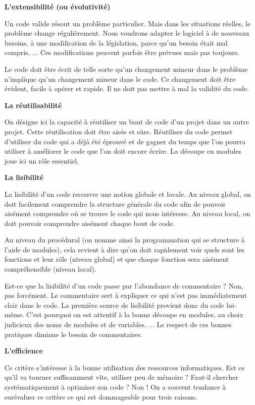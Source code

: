 {{\sffamily\bfseries\upshape
L'extensibilité (ou évolutivité)}

{
Un code valide résout un problème particulier. Mais dans les situations
réelles, le problème change régulièrement. Nous voudrons adapter le
logiciel à de nouveaux besoins, à une modification de la législation,
parce qu’un besoin était mal compris, ... Ces modifications peuvent
parfois être prévues mais pas toujours.}

{
Le code doit être écrit de telle sorte qu'un changement
mineur dans le problème n'implique
qu'un changement mineur dans le code. Ce changement
doit être évident, facile à opérer et rapide. Il ne doit pas mettre à
mal la validité du code.}

{\sffamily\bfseries\upshape
La réutilisabilité}

{
On désigne ici la capacité à réutiliser un bout de code
d'un projet dans un autre projet. Cette réutilisation
doit être aisée et sûre. Réutiliser du code permet
d'utiliser du code qui a déjà été éprouvé et de gagner
du temps que l'on pourra utiliser à améliorer le code
que l'on doit encore écrire. La découpe en modules
joue ici un rôle essentiel.}

{\sffamily\bfseries\upshape
La lisibilité}

{
La lisibilité d'un code recouvre une notion globale et
locale. Au niveau global, on doit facilement comprendre la structure
générale du code afin de pouvoir aisément comprendre où se trouve le
code qui nous intéresse. Au niveau local, on doit pouvoir comprendre
aisément chaque bout de code.}

{
Au niveau du procédural (on nomme ainsi la programmation qui se
structure à l'aide de modules), cela revient à dire
qu'on doit rapidement voir quels sont les fonctions et
leur rôle (niveau global) et que chaque fonction sera aisément
compréhensible (niveau local). }

{
Est-ce que la lisibilité d'un code passe par
l'abondance de commentaire ? Non, pas forcément. Le
commentaire sert à expliquer ce qui n'est pas
immédiatement clair dans le code. La première source de lisibilité
provient donc du code lui-même. C'est pourquoi on est
attentif à la bonne découpe en modules, au choix judicieux des noms de
modules et de variables, ... Le respect de ces bonnes pratiques diminue
le besoin de commentaires.}

{\sffamily\bfseries\upshape
L'efficience}

{
Ce critère s'intéresse à la bonne utilisation des
ressources informatiques. Est ce qu'il va tourner
suffisamment vite, utiliser peu de mémoire ? Faut-il chercher
systématiquement à optimiser son code ? Non ! On a souvent tendance à
surévaluer ce critère ce qui est dommageable pour trois raisons.}

}
